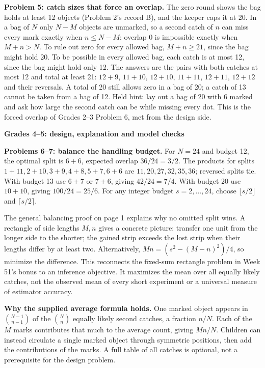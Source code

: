 \documentclass[letterpaper,11pt]{article}
\newcommand{\topic}[1]{\par\medskip\textbf{#1}\par}
\begin{document}
\textbf{Problem 5: catch sizes that force an overlap.} The zero round shows the bag holds at least 12 objects (Problem 2's record B), and the keeper caps it at 20. In a bag of $N$ only $N-M$ objects are unmarked, so a second catch of $n$ can miss every mark exactly when $n\le N-M$: overlap 0 is impossible exactly when $M+n>N$. To rule out zero for every allowed bag, $M+n\ge21$, since the bag might hold 20. To be possible in every allowed bag, each catch is at most 12, since the bag might hold only 12. The answers are the pairs with both catches at most 12 and total at least 21: $12+9$, $11+10$, $12+10$, $11+11$, $12+11$, $12+12$ and their reversals. A total of 20 still allows zero in a bag of 20; a catch of 13 cannot be taken from a bag of 12. Held hint: lay out a bag of 20 with 6 marked and ask how large the second catch can be while missing every dot. This is the forced overlap of Grades 2--3 Problem 6, met from the design side.
\newpage
\topic{Grades 4--5: design, explanation and model checks}
\textbf{Problems 6--7: balance the handling budget.} For $N=24$ and budget 12, the optimal split is $6+6$, expected overlap $36/24=3/2$. The products for splits $1+11,2+10,3+9,4+8,5+7,6+6$ are $11,20,27,32,35,36$; reversed splits tie. With budget 13 use $6+7$ or $7+6$, giving $42/24=7/4$. With budget 20 use $10+10$, giving $100/24=25/6$. For any integer budget $s=2,\ldots,24$, choose $\lfloor s/2\rfloor$ and $\lceil s/2\rceil$.

The general balancing proof on page 1 explains why no omitted split wins. A rectangle of side lengths $M,n$ gives a concrete picture: transfer one unit from the longer side to the shorter; the gained strip exceeds the lost strip when their lengths differ by at least two. Alternatively, $Mn=(s^2-(M-n)^2)/4$, so minimize the difference. This reconnects the fixed-sum rectangle problem in Week 51's bonus to an inference objective. It maximizes the mean over all equally likely catches, not the observed mean of every short experiment or a universal measure of estimator accuracy.

\textbf{Why the supplied average formula holds.} One marked object appears in $\binom{N-1}{n-1}$ of the $\binom Nn$ equally likely second catches, a fraction $n/N$. Each of the $M$ marks contributes that much to the average count, giving $Mn/N$. Children can instead circulate a single marked object through symmetric positions, then add the contributions of the marks. A full table of all catches is optional, not a prerequisite for the design problem.
\end{document}
